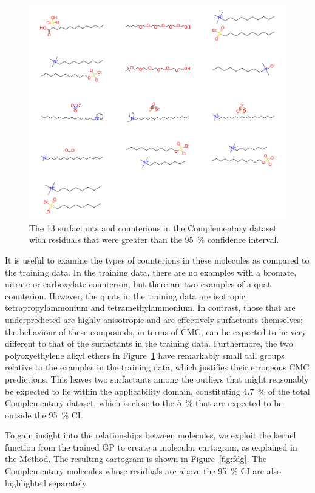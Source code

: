 \begin{figure}
    \includegraphics[width=\textwidth]{images/nist-underpred.pdf}
    \caption{The 13 surfactants and counterions in the Complementary dataset with residuals
        that were greater than the \SI{95}{\%} confidence interval.}
    \label{fig:nist-underpred}
\end{figure}

It is useful to examine the types of counterions in these molecules as compared
to the training data. In the training data, there are no examples with a
bromate, nitrate or carboxylate counterion, but there are two examples of a quat
counterion. However, the quats in the training data are isotropic:
tetrapropylammonium and tetramethylammonium. In contrast, those that are
underpredicted are highly anisotropic and are effectively surfactants
themselves; the behaviour of these compounds, in terms of CMC, can be expected
to be very different to that of the surfactants in the training data.
Furthermore, the two polyoxyethylene alkyl ethers in
Figure~\ref{fig:nist-underpred} have remarkably small tail groups relative to
the examples in the training data, which justifies their erroneous CMC
predictions. This leaves two surfactants among the outliers that might
reasonably be expected to lie within the applicability domain, constituting
\SI{4.7}{\%} of the total Complementary dataset, which is close to the
\SI{5}{\%} that are expected to be outside the \SI{95}{\%} CI.

To gain insight into the relationships between molecules, we exploit the kernel
function from the trained GP to create a molecular cartogram, as explained in
the Method. The resulting cartogram is shown in Figure~\ref{fig:fdg}. The Complementary
molecules whose residuals are above the \SI{95}{\%} CI are also highlighted
separately.

